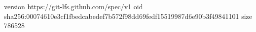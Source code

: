 version https://git-lfs.github.com/spec/v1
oid sha256:00074610e3cf1fbedcabedef7b572f98dd69fedf15519987d6e90b3f49841101
size 786528
